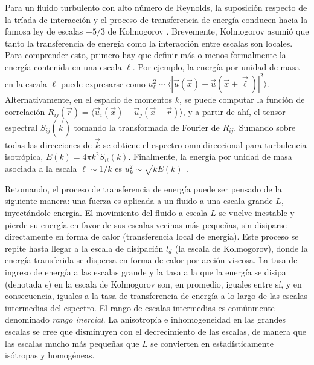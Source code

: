 Para un fluido turbulento con alto número de Reynolds, la suposición
respecto de la tríada de interacción y el proceso de transferencia de
energía conducen hacia la famosa ley de escalas $-5/3$ de Kolmogorov
\cite{batchelor_theory_1953, kolmogorov_local_1941}. Brevemente,
Kolmogorov asumió que tanto la transferencia de energía como la
interacción entre escalas son locales. Para comprender esto, primero
hay que definir más o menos formalmente la energía contenida en una
escala $\ell$. Por ejemplo, la energía por unidad de masa en la escala
$\ell$ puede expresarse como
$u_\ell^2 \sim \langle |\vec{u}(\vec{x}) -
\vec{u}(\vec{x}+\vec{\ell})|^2\rangle$. Alternativamente, en el
espacio de momentos $k$, se puede computar la función de correlación
$R_{ij}(\vec{r}) = \langle\vec{u}_i(\vec{x}) -
\vec{u}_j(\vec{x}+\vec{r})\rangle$, y a partir de ahí, el tensor
espectral $S_{ij}(\vec{k})$ tomando la transformada de Fourier de
$R_{ij}$. Sumando sobre todas las direcciones de $\vec{k}$ se obtiene
el espectro omnidireccional para turbulencia isotrópica,
$E(k) = 4\pi k^2 S_{ii}(k)$. Finalmente, la energía por unidad de masa
asociada a la escala $\ell \sim 1/k$ es $u_k^2 \sim \sqrt{kE(k)}$
\cite{batchelor_theory_1953}.

Retomando, el proceso de transferencia de energía puede ser pensado de
la siguiente manera: una fuerza es aplicada a un fluido a una escala
grande $L$, inyectándole energía. El movimiento del fluido a escala
$L$ se vuelve inestable y pierde su energía en favor de sus escalas
vecinas más pequeñas, sin disiparse directamente en forma de calor
(transferencia local de energía). Este proceso se repite hasta llegar
a la escala de disipación $l_d$ (la escala de Kolmogorov), donde la
energía transferida se dispersa en forma de calor por acción
viscosa. La tasa de ingreso de energía a las escalas grande y la tasa
a la que la energía se disipa (denotada $\epsilon$) en la escala de
Kolmogorov son, en promedio, iguales entre sí, y en consecuencia,
iguales a la tasa de transferencia de energía a lo largo de las
escalas intermedias del espectro. El rango de escalas intermedias es
comúnmente denominado \textit{rango inercial}. La anisotropía e
inhomogeneidad en las grandes escalas se cree que disminuyen con el
decrecimiento de las escalas, de manera que las escalas mucho más
pequeñas que $L$ se convierten en estadísticamente isótropas y
homogéneas.

